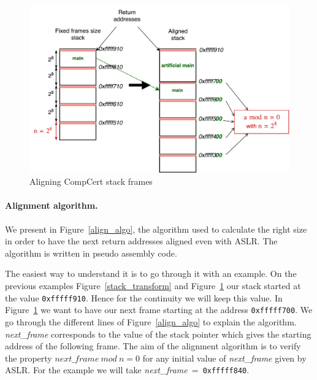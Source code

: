 \documentclass[11pt]{sdm}
\begin{document}
\begin{figure}[!ht]
\centering
\includegraphics[scale=0.6]{images/stack_align.pdf}
\caption{Aligning CompCert stack frames}
\label{stack_align}
\end{figure}

\paragraph{Alignment algorithm.}
\label{par:Alignment algorithm}
We present in Figure~\ref{align_algo}, the algorithm used to calculate the right size in order to have the next return addresses aligned even with ASLR. The algorithm is written in pseudo assembly code.

The easiest way to understand it is to go through it with an example. On the previous examples Figure~\ref{stack_transform} and Figure~\ref{stack_align} our stack started at the value \texttt{0xfffff910}. Hence for the continuity we will keep this value. 
In Figure~\ref{stack_align} we want to have our next frame starting at the address \texttt{0xfffff700}. 
We go through the different lines of Figure~\ref{align_algo} to explain the algorithm.
\textit{next\_frame} corresponds to the value of the stack pointer which gives the starting address of the following frame.
The aim of the alignment algorithm is to verify the property $\textit{next\_frame}~mod~n=0$ for any initial value of \textit{next\_frame} given by ASLR. For the example we will take \textit{next\_frame}~=~\texttt{0xfffff840}.\\
\end{document}
